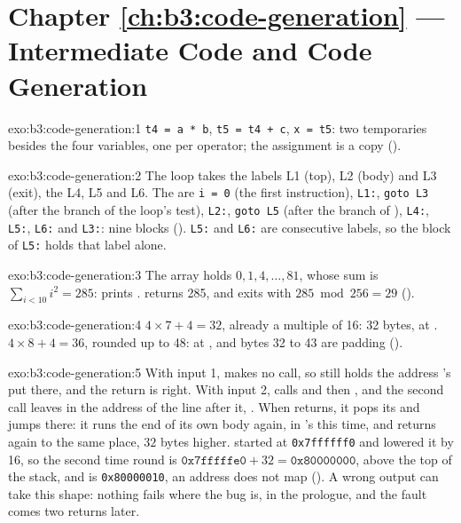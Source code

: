 \section*{Chapter \ref{ch:b3:code-generation} --- Intermediate Code and Code Generation}

\begin{solution}{exo:b3:code-generation:1}
\texttt{t4 = a * b}, \texttt{t5 = t4 + c}, \texttt{x = t5}: two temporaries besides the four variables, one per operator; the assignment is a copy ().
\end{solution}

\begin{solution}{exo:b3:code-generation:2}
The loop takes the labels L1 (top), L2 (body) and L3 (exit), the  L4, L5 and L6. The  are \texttt{i = 0} (the first instruction), \texttt{L1:}, \texttt{goto L3} (after the branch of the loop's test), \texttt{L2:}, \texttt{goto L5} (after the branch of ), \texttt{L4:}, \texttt{L5:}, \texttt{L6:} and \texttt{L3:}: nine blocks (). \texttt{L5:} and \texttt{L6:} are consecutive labels, so the block of \texttt{L5:} holds that label alone.
\end{solution}

\begin{solution}{exo:b3:code-generation:3}
The array holds $0, 1, 4, \dots, 81$, whose sum is $\sum_{i < 10} i^2 = 285$:  prints .  returns 285, and  exits with $285 \bmod 256 = 29$ ().
\end{solution}

\begin{solution}{exo:b3:code-generation:4}
$4 \times 7 + 4 = 32$, already a multiple of 16: 32 bytes,  at . $4 \times 8 + 4 = 36$, rounded up to 48:  at , and bytes 32 to 43 are padding ().
\end{solution}

\begin{solution}{exo:b3:code-generation:5}
With input 1,  makes no call, so  still holds the address 's  put there, and the return is right. With input 2,  calls  and then , and the second call leaves in  the address of the line after it, . When  returns, it pops its  and jumps there: it runs the end of its own body again, in 's  this time, and returns again to the same place, $32$ bytes higher.  started at \texttt{0x7ffffff0} and  lowered it by 16, so the second time round  is $\texttt{0x7fffffe0} + 32 = \texttt{0x80000000}$, above the top of the stack, and  is \texttt{0x80000010}, an address  does not map (). A wrong output can take this shape: nothing fails where the bug is, in the prologue, and the fault comes two returns later.
\end{solution}

